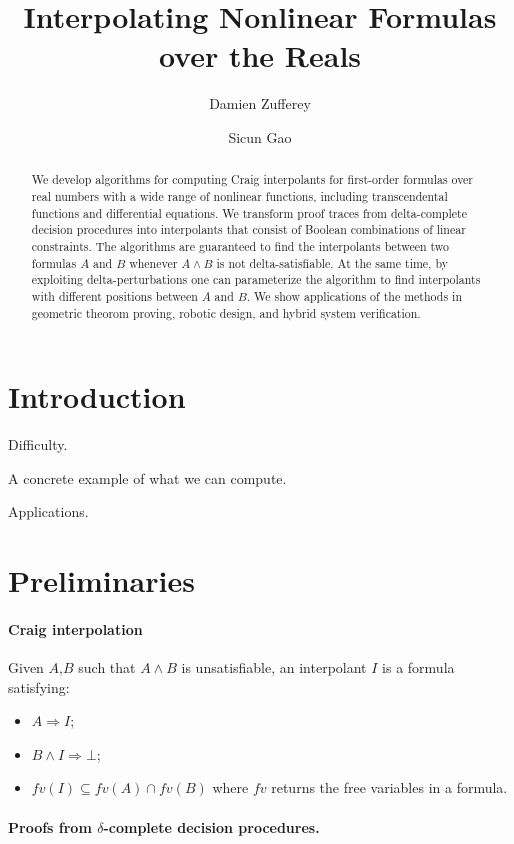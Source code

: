 \documentclass{llncs}
\begin{document}
\title{Interpolating Nonlinear Formulas over the Reals}
\author{Damien Zufferey \and Sicun Gao}

\maketitle
\begin{abstract}
We develop algorithms for computing Craig interpolants for first-order formulas over real numbers with a wide range of nonlinear functions, including transcendental functions and differential equations. We transform proof traces from delta-complete decision procedures into interpolants that consist of Boolean combinations of linear constraints. The algorithms are guaranteed to find the interpolants between two formulas $A$ and $B$ whenever $A\wedge B$ is not delta-satisfiable. At the same time, by exploiting delta-perturbations one can parameterize the algorithm to find interpolants with different positions between $A$ and $B$. We show applications of the methods in geometric theorom proving, robotic design, and hybrid system verification.  
\end{abstract}

\section{Introduction}

Difficulty. 

A concrete example of what we can compute. 

Applications. 

\section{Preliminaries}

\paragraph{Craig interpolation}
Given $A$,$B$ such that $A ∧ B$ is unsatisfiable, an interpolant $I$ is a formula satisfying:
\begin{itemize}
\item $A ⇒ I$;
\item $B ∧ I ⇒ ⊥$;
\item $fv(I) ⊆ fv(A) ∩ fv(B)$ where $fv$ returns the free variables in a formula.
\end{itemize}

\paragraph{Proofs from $\delta$-complete decision procedures.}
\end{document}
